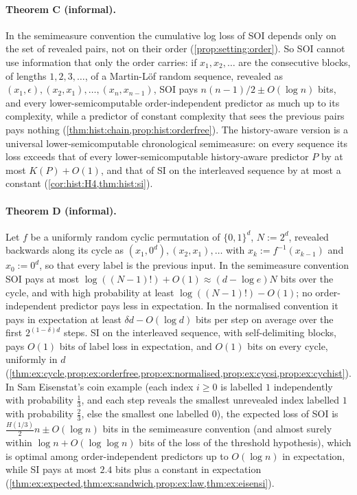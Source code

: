 \paragraph{Theorem C (informal).} In the semimeasure convention the cumulative log loss of SOI depends only on the set of revealed pairs, not on their order (\cref{prop:setting:order}). So SOI cannot use information that only the order carries: if $x_1,x_2,\dots$ are the consecutive blocks, of lengths $1,2,3,\dots$, of a Martin-L\"of random sequence, revealed as $(x_1,\epsilon),(x_2,x_1),\dots,(x_n,x_{n-1})$, SOI pays $n(n-1)/2\pm O(\log n)$ bits, and every lower-semicomputable order-independent predictor as much up to its complexity, while a predictor of constant complexity that sees the previous pairs pays nothing (\cref{thm:hist:chain,prop:hist:orderfree}). The history-aware version \SFIhist{} is a universal lower-semicomputable chronological semimeasure: on every sequence its loss exceeds that of every lower-semicomputable history-aware predictor $P$ by at most $K(P)+O(1)$, and that of SI on the interleaved sequence by at most a constant (\cref{cor:hist:H4,thm:hist:si}).

\paragraph{Theorem D (informal).} Let $f$ be a uniformly random cyclic permutation of $\{0,1\}^d$, $N:=2^d$, revealed backwards along its cycle as $(x_1,0^d),(x_2,x_1),\dots$ with $x_k:=f^{-1}(x_{k-1})$ and $x_0:=0^d$, so that every label is the previous input. In the semimeasure convention SOI pays at most $\log((N-1)!)+O(1)\approx(d-\log e)N$ bits over the cycle, and with high probability at least $\log((N-1)!)-O(1)$; no order-independent predictor pays less in expectation. In the normalised convention it pays in expectation at least $\delta d-O(\log d)$ bits per step on average over the first $2^{(1-\delta)d}$ steps. SI on the interleaved sequence, with self-delimiting blocks, pays $O(1)$ bits of label loss in expectation, and \SFIhist{} $O(1)$ bits on every cycle, uniformly in $d$ (\cref{thm:ex:cycle,prop:ex:orderfree,prop:ex:normalised,prop:ex:cycsi,prop:ex:cychist}). In Sam Eisenstat's coin example (each index $i\ge0$ is labelled $1$ independently with probability $\frac13$, and each step reveals the smallest unrevealed index labelled $1$ with probability $\frac23$, else the smallest one labelled $0$), the expected loss of SOI is $\frac{H(1/3)}2n\pm O(\log n)$ bits in the semimeasure convention (and almost surely within $\log n+O(\log\log n)$ bits of the loss of the threshold hypothesis), which is optimal among order-independent predictors up to $O(\log n)$ in expectation, while SI pays at most $2.4$ bits plus a constant in expectation (\cref{thm:ex:expected,thm:ex:sandwich,prop:ex:law,thm:ex:eisensi}).

